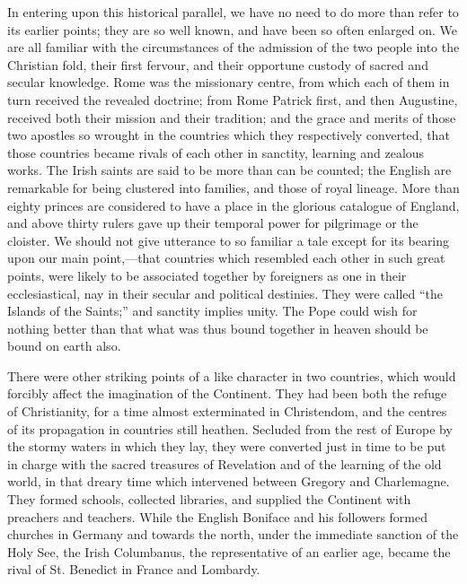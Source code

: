 In entering upon this
historical parallel, we have no need to do more than refer to
its earlier points; they are so well known, and have been so often
enlarged on. We are all familiar with the circumstances of the
admission of the two people into the Christian fold, their first
fervour, and their opportune custody of sacred and secular knowledge.
Rome was the missionary centre, from which each of them in turn
received the revealed doctrine; from Rome Patrick first, and then
Augustine, received both their mission and their tradition; and the
grace and merits of those two apostles so wrought in the countries
which they respectively converted, that those countries became rivals
of each other in sanctity, learning and zealous works. The Irish
saints are said to be more than can be counted; the English are
remarkable for being clustered into families, and those of royal
lineage. More than eighty princes are considered to have a place in
the glorious catalogue of England, and above thirty rulers gave up
their temporal power for pilgrimage or the cloister. We should not
give utterance to so familiar a tale except for its bearing upon our
main point,—that countries which resembled each other in such great
points, were likely to be associated together by foreigners as one in
their ecclesiastical, nay in their secular and political destinies.
They were called ``the Islands of the Saints;'' and sanctity implies
unity. The Pope could wish for nothing better than that what was thus
bound together in heaven should be bound on earth also.

There were other striking
points of a like character in two countries, which would forcibly
affect the imagination of the Continent. They had been both the refuge
of Christianity, for a time almost exterminated in Christendom, and
the centres of its propagation in countries still heathen. Secluded
from the rest of Europe by the stormy waters in which they lay, they
were converted just in time to be put in charge with the sacred
treasures of Revelation and of the learning of the old world, in that
dreary time which intervened between Gregory and Charlemagne. They
formed schools, collected libraries, and supplied the Continent with
preachers and teachers. While the English Boniface and his followers
formed churches in Germany and towards the north, under the immediate
sanction of the Holy See, the Irish Columbanus, the representative of
an earlier age, became the rival of St. Benedict in France and
Lombardy.

